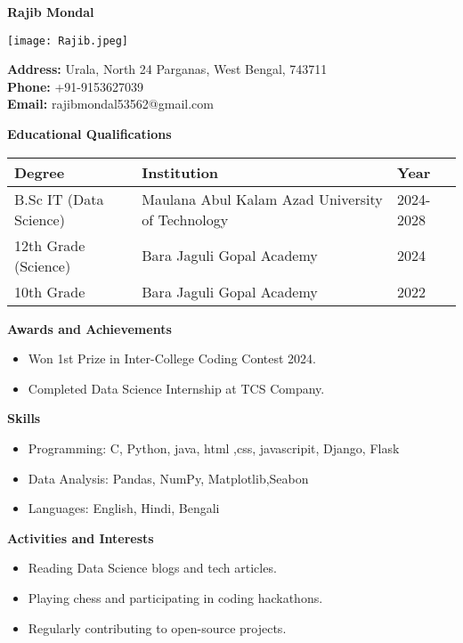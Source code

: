 \documentclass[12pt,lettepaper]{article}
\begin{document}
\begin{flushleft}
    \Huge \textbf{Rajib Mondal }
\end{flushleft}

\begin{flushright}
    \texttt{[image: Rajib.jpeg]}
\end{flushright}

\noindent
\textbf{Address:} Urala, North 24 Parganas, West Bengal, 743711 \\
\textbf{Phone:} +91-9153627039 \\
\textbf{Email:} rajibmondal53562@gmail.com

\vspace{0.5cm}

\noindent
\textbf{\large Educational Qualifications}

\begin{tabular}{| m{5cm} | m{5cm} | m{3cm} |}
    \hline
    \textbf{Degree} & \textbf{Institution} & \textbf{Year} \\
    \hline
    B.Sc IT (Data Science) & Maulana Abul Kalam Azad University of Technology & 2024-2028 \\
    \hline
    12th Grade (Science) & Bara Jaguli Gopal Academy & 2024 \\
    \hline
    10th Grade & Bara Jaguli Gopal Academy & 2022 \\
    \hline
\end{tabular}

\vspace{0.5cm}

\noindent
\textbf{\large Awards and Achievements}
\begin{itemize}
    \item Won 1st Prize in Inter-College Coding Contest 2024.
    \item Completed Data Science Internship at TCS Company.
\end{itemize}

\noindent
\textbf{\large Skills}
\begin{itemize}
    \item Programming: C, Python, java, html ,css, javascripit, Django, Flask
    \item Data Analysis: Pandas, NumPy, Matplotlib,Seabon  
    \item Languages: English, Hindi, Bengali
\end{itemize}

\noindent
\textbf{\large Activities and Interests}
\begin{itemize}
    \item Reading Data Science blogs and tech articles.
    \item Playing chess and participating in coding hackathons.
    \item Regularly contributing to open-source projects.
\end{itemize}
\end{document}
